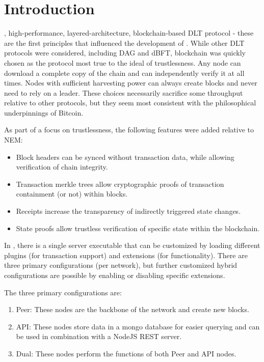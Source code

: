 \section{Introduction}
\label{sec:introduction}


, high-performance, layered-architecture, blockchain-based DLT protocol - these are the first principles that influenced the development of \codename.
While other DLT protocols were considered, including DAG and dBFT, blockchain was quickly chosen as the protocol most true to the ideal of trustlessness.
Any node can download a complete copy of the chain and can independently verify it at all times.
Nodes with sufficient harvesting power can always create blocks and never need to rely on a leader.
These choices necessarily sacrifice some throughput relative to other protocols, but they seem most consistent with the philosophical underpinnings of Bitcoin.

As part of a focus on trustlessness, the following features were added relative to NEM:
\begin{itemize}
	\item{Block headers can be synced without transaction data, while allowing verification of chain integrity.}
	\item{Transaction merkle trees allow cryptographic proofs of transaction containment (or not) within blocks.}
	\item{Receipts increase the transparency of indirectly triggered state changes.}
	\item{State proofs allow trustless verification of specific state within the blockchain.}
\end{itemize}

In \codename, there is a single server executable that can be customized by loading different plugins (for transaction support) and extensions (for functionality).
There are three primary configurations (per network), but further customized hybrid configurations are possible by enabling or disabling specific extensions.

The three primary configurations are:
\begin{enumerate}
	\item{Peer: These nodes are the backbone of the network and create new blocks.}
	\item{API: These nodes store data in a mongo database for easier querying and can be used in combination with a NodeJS REST server.}
	\item{Dual: These nodes perform the functions of both Peer and API nodes.}
\end{enumerate}

